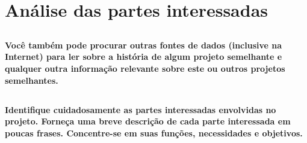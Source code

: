 \documentclass[a4paper,12pt]{report}
\begin{document}
\section{Análise das partes interessadas}
\subsection*{}
\textbf{Você também pode procurar outras fontes de dados (inclusive na Internet) para ler sobre a história de algum projeto semelhante e qualquer outra informação relevante sobre este ou outros projetos semelhantes.}

\subsection*{}
\textbf{Identifique cuidadosamente as partes interessadas envolvidas no projeto. Forneça uma breve descrição de cada parte interessada em poucas frases. Concentre-se em suas funções, necessidades e objetivos.}
\end{document}
